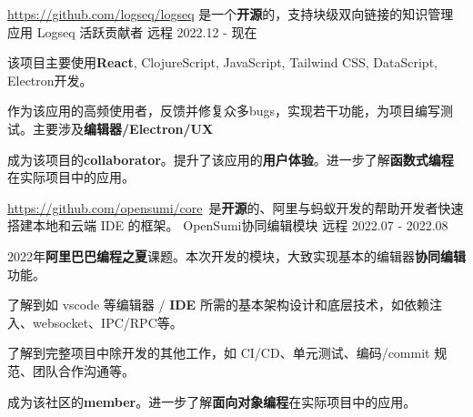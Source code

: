 

\begin{cventries}


    \cventry
    {\href{https://github.com/logseq/logseq}{https://github.com/logseq/logseq} 是一个\textbf{开源}的，支持块级双向链接的知识管理应用} %
    {Logseq 活跃贡献者} %
    {远程} %
    {2022.12 - 现在} %
    {
        \begin{cvitems} %
            \item {该项目主要使用\textbf{React}, ClojureScript, JavaScript, Tailwind CSS, DataScript, Electron开发。}
            \item {作为该应用的高频使用者，反馈并修复众多bugs，实现若干功能，为项目编写测试。主要涉及\textbf{编辑器/Electron/UX}}
            \item {成为该项目的\textbf{collaborator}。提升了该应用的\textbf{用户体验}。进一步了解\textbf{函数式编程}在实际项目中的应用。}
        \end{cvitems}
    }


    \cventry
    {\href{https://github.com/opensumi/core}{https://github.com/opensumi/core}\ 是\textbf{开源}的、阿里与蚂蚁开发的帮助开发者快速搭建本地和云端 IDE 的框架。} %
    {OpenSumi协同编辑模块} %
    {远程} %
    {2022.07 - 2022.08} %
    {
        \begin{cvitems} %
            \item {2022年\textbf{阿里巴巴编程之夏}课题。本次开发的模块，大致实现基本的编辑器\textbf{协同编辑}功能。}
            \item {了解到如 vscode 等编辑器 / \textbf{IDE} 所需的基本架构设计和底层技术，如依赖注入、websocket、IPC/RPC等。}
            \item {了解到完整项目中除开发的其他工作，如 CI/CD、单元测试、编码/commit 规范、团队合作沟通等。}
            \item {成为该社区的\textbf{member}。进一步了解\textbf{面向对象编程}在实际项目中的应用。}
        \end{cvitems}
    }


\end{cventries}
